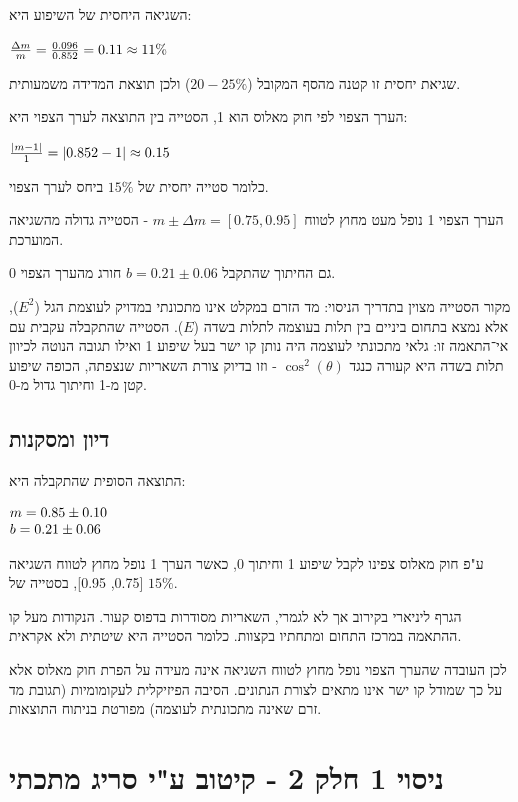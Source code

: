 \documentclass[14pt]{extarticle}
\makeatletter
\newenvironment{lefteqs}{%
    \begin{english}%
    \begin{flushleft}%
    \renewcommand{\arraystretch}{1.3}%
    $\begin{array}{@{}l@{}}%
}{%
    \end{array}$%
    \end{flushleft}%
    \end{english}%
}
\makeatother
\begin{document}
השגיאה היחסית של השיפוע היא:
\begin{lefteqs}
    \frac{\Delta m}{m} = \frac{0.096}{0.852} = 0.11 \approx 11\%
\end{lefteqs}

שגיאת יחסית זו קטנה מהסף המקובל ($20-25\%$) ולכן תוצאת המדידה משמעותית.

הערך הצפוי לפי חוק מאלוס הוא 1, הסטייה בין התוצאה לערך הצפוי היא:
\begin{lefteqs}
    \frac{|m - 1|}{1} = |0.852 - 1| \approx 0.15
\end{lefteqs}

כלומר סטייה יחסית של $15\%$ ביחס לערך הצפוי.

הערך הצפוי 1 נופל מעט מחוץ לטווח $m \pm \Delta m = [0.75, 0.95]$ - הסטייה גדולה מהשגיאה המוערכת.

גם החיתוך שהתקבל $b=0.21 \pm 0.06$ חורג מהערך הצפוי 0.

מקור הסטייה מצוין בתדריך הניסוי: מד הזרם במקלט אינו מתכונתי במדויק לעוצמת הגל ($E^2$),
אלא נמצא בתחום ביניים בין תלות בעוצמה לתלות בשדה ($E$).
הסטייה שהתקבלה עקבית עם אי־התאמה זו: גלאי מתכונתי לעוצמה היה נותן קו ישר בעל שיפוע  1
ואילו תגובה הנוטה לכיוון תלות בשדה היא קעורה כנגד $\cos^2(\theta)$ - 
וזו בדיוק צורת השאריות שנצפתה, הכופה שיפוע קטן מ-1 וחיתוך גדול מ-0.

\subsection*{דיון ומסקנות}
התוצאה הסופית שהתקבלה היא:
\begin{lefteqs}
    m = 0.85 \pm 0.10 \\
    b = 0.21 \pm 0.06
\end{lefteqs}

ע"פ חוק מאלוס צפינו לקבל שיפוע 1 וחיתוך 0, כאשר הערך 1 נופל מחוץ לטווח השגיאה [0.75, 0.95], בסטייה של $15\%$.

הגרף ליניארי בקירוב אך לא לגמרי, השאריות מסודרות בדפוס קעור. הנקודות מעל קו ההתאמה במרכז התחום ומתחתיו בקצוות.
כלומר הסטייה היא שיטתית ולא אקראית.

לכן העובדה שהערך הצפוי נופל מחוץ לטווח השגיאה אינה מעידה על הפרת חוק מאלוס אלא על כך שמודל קו ישר אינו מתאים לצורת הנתונים.
הסיבה הפיזיקלית לעקומומיות (תגובת מד זרם שאינה מתכונתית לעוצמה) מפורטת בניתוח התוצאות.

\newpage


\section*{ניסוי 1 חלק 2 - קיטוב ע"י סריג מתכתי}
\end{document}
